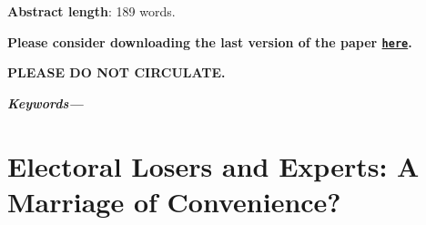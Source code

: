 \documentclass[11pt]{article}\usepackage[]{graphicx}\usepackage[]{xcolor}
\begin{document}
\vspace{-1cm}
\begin{abstract}
\unskip
\end{abstract}



\vspace*{0.3cm}
\centerline{{\bf Abstract length}: 189 words.}
\vspace*{0.3cm}


\centerline{\bf Please consider downloading the last version of the paper \href{https://raw.githubusercontent.com/hbahamonde/democratic_backsliding/main/2025/Dem_Backsliding_2.pdf}{\texttt{{\color{red}here}}}.}

\vspace*{0.3cm}
\centerline{\bf {\color{red}PLEASE DO NOT CIRCULATE}.}

\vspace*{0.5cm}
\centerline{\providecommand{\keywords}[1]{\textbf{\textit{Keywords---}} #1} %
\keywords{{\unskip}}}



\clearpage
{}
\setcounter{page}{1}

\section{Electoral Losers and Experts: A Marriage of Convenience?}
\end{document}
